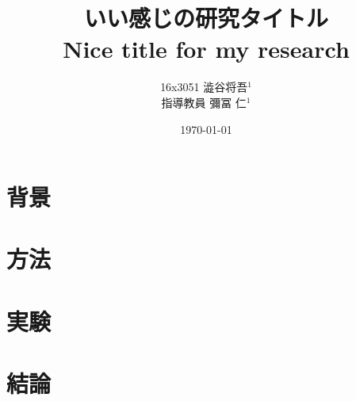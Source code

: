 \documentclass[twocolumn, a4paper, dvipdfmx]{ieicejsp}
\title{{\bf いい感じの研究タイトル}
  {\normalsize \\ Nice title for my research}}
\author{
    16x3051 澁谷将吾$^1$ \\
    指導教員 彌冨 仁$^1$ \\ 
}
\date{\today}
\begin{document}
\maketitle

\begin{abstract}
    
\end{abstract}

\section{背景}
    

\section{方法}
    

\section{実験}
    
    
\section{結論}
    
	  

{\scriptsize
    
}
\end{document}
